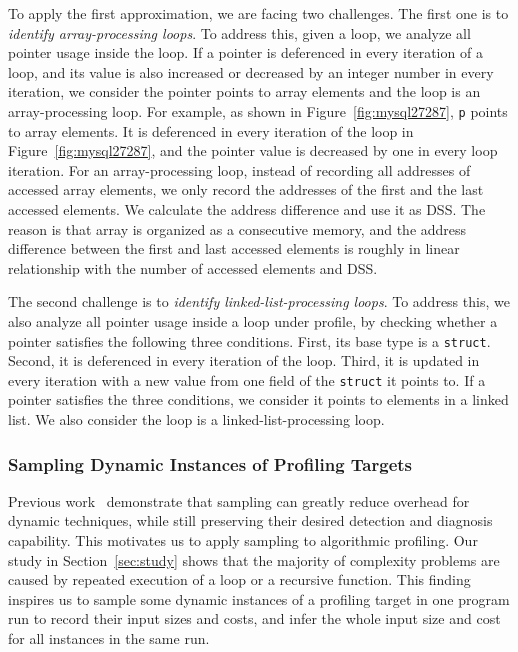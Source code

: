 {{To apply the first approximation, we are facing two challenges. 
The first one is to \emph{identify array-processing loops}.
To address this, given a loop, we analyze all pointer usage inside the loop. 
If a pointer is deferenced in every iteration of a loop, 
and its value is also increased or decreased by 
an integer number in every iteration,
we consider the pointer points to array elements and 
the loop is an array-processing loop.  
For example, as shown in Figure~\ref{fig:mysql27287}, 
\texttt{p} points to array elements. 
It is deferenced in every iteration of the loop 
in Figure~\ref{fig:mysql27287},
and the pointer value is decreased by one in every loop iteration. 
For an array-processing loop, 
instead of recording all addresses of 
accessed array elements,
we only record the addresses 
of the first and the last accessed elements. 
We calculate the address difference and use it as DSS.
The reason is that array is organized as a 
consecutive memory, and the address difference 
between the first and last accessed elements is roughly in linear 
relationship with the number of accessed elements and DSS. 



The second challenge is to \emph{identify linked-list-processing loops}.
To address this, we also analyze all pointer usage inside a loop under profile, 
by checking whether a pointer satisfies the following three conditions.
First, its base type is a \texttt{struct}.
Second, it is deferenced in every iteration of the loop.
Third, it is updated in every iteration with a new value 
from one field of the \texttt{struct} it points to.
If a pointer satisfies the three conditions, 
we consider it points to elements in a linked list.
We also consider the loop is a linked-list-processing loop. 



\subsubsection{Sampling Dynamic Instances of Profiling Targets}


Previous work~\cite{liblit03,liblit05,CCI,SongOOPSLA2014,ldoctor}
demonstrate that sampling can greatly 
reduce overhead for dynamic techniques,
while still preserving their desired 
detection and diagnosis capability. 
This motivates us to apply sampling to algorithmic profiling. 
Our study in Section~\ref{sec:study} shows that 
the majority of complexity problems are caused by repeated execution of a loop
or a recursive function. 
This finding inspires us to sample some dynamic instances of 
a profiling target in one program run to 
record their input sizes and costs,
and infer the whole input size and cost for all instances in the same run.


}}
